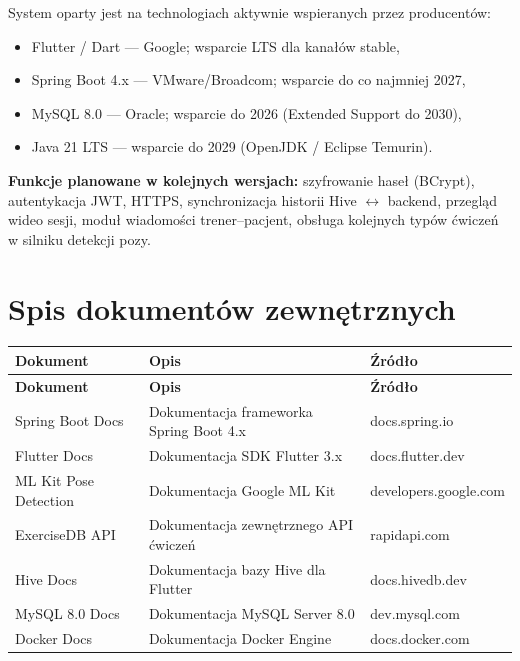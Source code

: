 \documentclass[12pt,a4paper]{article}
\begin{document}
System oparty jest na technologiach aktywnie wspieranych przez producentów:
\begin{itemize}
  \item Flutter / Dart --- Google; wsparcie LTS dla kanałów stable,
  \item Spring Boot 4.x --- VMware/Broadcom; wsparcie do co najmniej 2027,
  \item MySQL 8.0 --- Oracle; wsparcie do 2026 (Extended Support do 2030),
  \item Java 21 LTS --- wsparcie do 2029 (OpenJDK / Eclipse Temurin).
\end{itemize}

\textbf{Funkcje planowane w kolejnych wersjach:} szyfrowanie haseł (BCrypt), autentykacja JWT, HTTPS, synchronizacja historii Hive $\leftrightarrow$ backend, przegląd wideo sesji, moduł wiadomości trener--pacjent, obsługa kolejnych typów ćwiczeń w silniku detekcji pozy.

\section{Spis dokumentów zewnętrznych}

\begin{center}
\begin{longtable}{lp{6cm}l}
  \toprule
  \textbf{Dokument} & \textbf{Opis} & \textbf{Źródło} \\
  \midrule
  \endfirsthead
  \toprule
  \textbf{Dokument} & \textbf{Opis} & \textbf{Źródło} \\
  \midrule
  \endhead
  Spring Boot Docs       & Dokumentacja frameworka Spring Boot 4.x & docs.spring.io \\
  Flutter Docs           & Dokumentacja SDK Flutter 3.x & docs.flutter.dev \\
  ML Kit Pose Detection  & Dokumentacja Google ML Kit & developers.google.com \\
  ExerciseDB API         & Dokumentacja zewnętrznego API ćwiczeń & rapidapi.com \\
  Hive Docs              & Dokumentacja bazy Hive dla Flutter & docs.hivedb.dev \\
  MySQL 8.0 Docs         & Dokumentacja MySQL Server 8.0 & dev.mysql.com \\
  Docker Docs            & Dokumentacja Docker Engine & docs.docker.com \\
  \bottomrule
\end{longtable}
\end{center}
\end{document}
